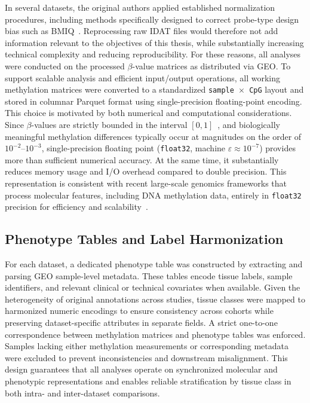 In several datasets, the original authors applied established normalization procedures, including methods specifically designed to correct probe-type design bias such as BMIQ~\cite{Teschendorff2013BMIQ}. Reprocessing raw IDAT files would therefore not add information relevant to the objectives of this thesis, while substantially increasing technical complexity and reducing reproducibility. For these reasons, all analyses were conducted on the processed $\beta$-value matrices as distributed via GEO.
To support scalable analysis and efficient input/output operations, all working methylation matrices were converted to a standardized \texttt{sample~$\times$~CpG} layout and stored in columnar Parquet format using single-precision floating-point encoding.
This choice is motivated by both numerical and computational considerations. Since $\beta$-values are strictly bounded in the interval $[0,1]$~\cite{Du2010}, and biologically meaningful methylation differences typically occur at magnitudes on the order of $10^{-2}$–$10^{-3}$, single-precision floating point (\texttt{float32}, machine $\varepsilon \approx 10^{-7}$) provides more than sufficient numerical accuracy. At the same time, it substantially reduces memory usage and I/O overhead compared to double precision.
This representation is consistent with recent large-scale genomics frameworks that process molecular features, including DNA methylation data, entirely in \texttt{float32} precision for efficiency and scalability~\cite{deAlmeida2025ChatNT}.

\subsection{Phenotype Tables and Label Harmonization}

For each dataset, a dedicated phenotype table was constructed by extracting and parsing GEO sample-level metadata. These tables encode tissue labels, sample identifiers, and relevant clinical or technical covariates when available. Given the heterogeneity of original annotations across studies, tissue classes were mapped to harmonized numeric encodings to ensure consistency across cohorts while preserving dataset-specific attributes in separate fields.
A strict one-to-one correspondence between methylation matrices and phenotype tables was enforced. Samples lacking either methylation measurements or corresponding metadata were excluded to prevent inconsistencies and downstream misalignment. This design guarantees that all analyses operate on synchronized molecular and phenotypic representations and enables reliable stratification by tissue class in both intra- and inter-dataset comparisons.

